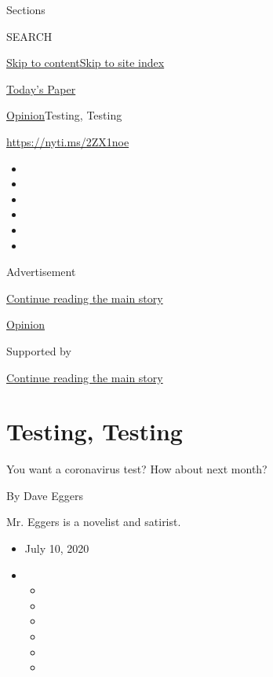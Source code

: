 Sections

SEARCH

\protect\hyperlink{site-content}{Skip to
content}\protect\hyperlink{site-index}{Skip to site index}

\href{https://myaccount.nytimes3xbfgragh.onion/auth/login?response_type=cookie\&client_id=vi}{}

\href{https://www.nytimes3xbfgragh.onion/section/todayspaper}{Today's
Paper}

\href{/section/opinion}{Opinion}\textbar{}Testing, Testing

\url{https://nyti.ms/2ZX1noe}

\begin{itemize}
\item
\item
\item
\item
\item
\item
\end{itemize}

Advertisement

\protect\hyperlink{after-top}{Continue reading the main story}

\href{/section/opinion}{Opinion}

Supported by

\protect\hyperlink{after-sponsor}{Continue reading the main story}

\hypertarget{testing-testing}{%
\section{Testing, Testing}\label{testing-testing}}

You want a coronavirus test? How about next month?

By Dave Eggers

Mr. Eggers is a novelist and satirist.

\begin{itemize}
\item
  July 10, 2020
\item
  \begin{itemize}
  \item
  \item
  \item
  \item
  \item
  \item
  \end{itemize}
\end{itemize}

